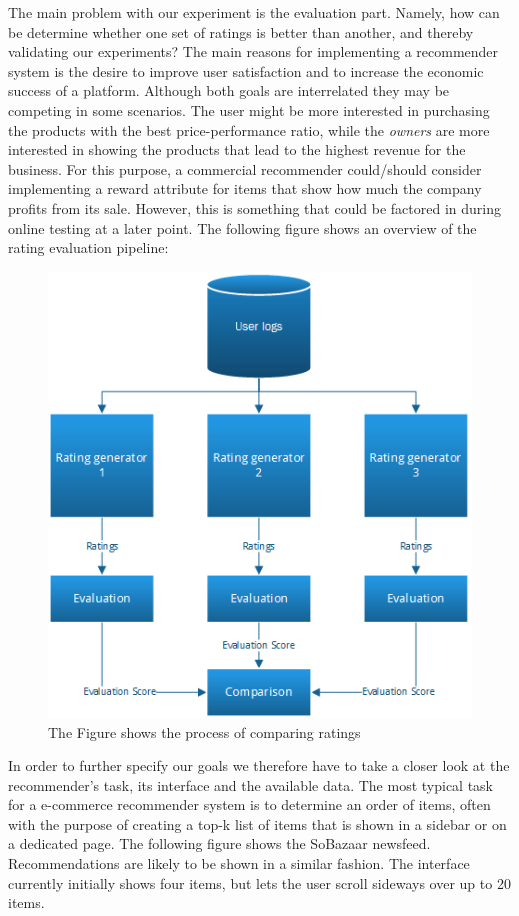 The main problem with our experiment is the evaluation part. Namely, how can be determine
whether one set of ratings is better than another, and thereby validating our experiments?
The main reasons for implementing a recommender system is the desire to improve user
satisfaction and to increase the economic
success of a platform. Although both goals are interrelated they may be competing in some
scenarios. The user might be more interested in purchasing the products with the best
price-performance ratio, while the \emph{owners}
are more interested in showing the products that lead to the highest revenue for the
business. For this purpose, a commercial recommender could/should consider implementing
a reward attribute for items that show how much the company profits from its sale. However,
this is something that could be factored in during online testing at a later point.
The following figure shows an overview of the rating evaluation pipeline:

\begin{figure}[H]
		\centering
	  	\includegraphics[scale=0.7]{image/ratinggeneval.png}
		\caption[Comparing Ratings]{The Figure shows the process of comparing ratings}
		\label{figure:compareratings}
\end{figure}

In order to further specify our goals we therefore have to take a closer look at the recommender's task,
its interface and the available data. The most typical task for a e-commerce recommender system is to
determine an order of items, often with the purpose of creating a top-k list of items that is shown in a sidebar
or on a dedicated page. The following figure shows the SoBazaar newsfeed. Recommendations are likely
to be shown in a similar fashion. The interface currently initially shows four items, but lets the
user scroll sideways over up to 20 items.

